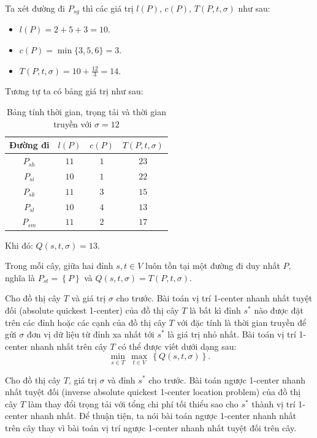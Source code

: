 \documentclass[12pt,oneside,a4paper]{bookAnh1}
\theoremstyle{plain}
\theoremstyle{nonumberplain}
\numberwithin{equation}{chapter}
\begin{document}
{\begin{example}
Ta xét đường đi ${{P}_{sg}}$ thì các giá trị
$l(P)$, $c(P)$, $T(P,t,\sigma)$ như sau:
\begin{itemize}
\item $l(P)=2+5+3=10.$
\item $c(P)=\min\{3,5,6\}=3.$
\item $T\left( P,t,\sigma  \right)=10+\frac{12}{3}=14.$
\end{itemize}
Tương tự ta có bảng giá trị như sau:
    \begin{table}[H]
        \centering
\caption{Bảng tính thời gian, trọng tải và thời gian truyền với $\sigma =12$}
        \label{tab1}
       \begin{tabular}{c c c c }
  \hline
  Đường đi & $l(P)$ & $c(P)$  & $T(P,t,\sigma )$   \\
  \hline
${{P}_{sh}}$ & $11$    & $1$  & $23$\\
${{P}_{si}}$ & $10$    & $1$  & $22$ \\
${{P}_{sk}}$ & $11$    & $3$  & $15$ \\
${{P}_{sl}}$ & $10$    & $4$  & $13$ \\
${{P}_{sm}}$ & $11$    & $2$  & $17$ \\
 \hline
\end{tabular}
    \end{table}
Khi đó: $Q\left( s,t,\sigma  \right)=13.$
\end{example}
\begin{remark}
    Trong mỗi cây, giữa hai đỉnh $s,t\in V$ luôn tồn tại một đường đi duy nhất $P,$ nghĩa là ${{P}_{st}}=\left\{ P \right\}$ và $Q\left( s,t,\sigma  \right)=T\left( P,t,\sigma  \right).$
\end{remark}
\begin{definition}
    Cho đồ thị cây $T$ và giá trị $\sigma $ cho trước. Bài toán vị trí 1-center nhanh nhất tuyệt đối (absolute quickest 1-center) của đồ thị cây $T$ là bất kì đỉnh $s^*$ nào được đặt trên các đỉnh hoặc các cạnh của đồ thị cây $T$ với đặc tính là thời gian truyền để gửi $\sigma $ đơn vị dữ liệu từ đỉnh xa nhất tới $s^*$ là giá trị nhỏ nhất. Bài toán vị trí 1-center nhanh nhất trên cây $T$ có thể được viết dưới dạng sau:
$$\underset{s\in T}{\mathop{\min }}\,\underset{t\in V}{\mathop{\max }}\,\left\{ Q\left( s,t,\sigma  \right) \right\}.$$
\end{definition}

\begin{definition}
Cho đồ thị cây $T$, giá trị $\sigma $ và đỉnh $s^*$ cho trước. Bài toán ngược 1-center nhanh nhất tuyệt đối (inverse absolute quickest 1-center location problem) của đồ thị cây $T$ làm thay đổi trọng tải với tổng chi phí tối thiểu sao cho $s^*$ thành vị trí 1-center nhanh nhất. Để thuận tiện, ta nói bài toán ngược 1-center nhanh nhất trên cây thay vì bài toán vị trí ngược 1-center nhanh nhất tuyệt đối trên cây.
\end{definition}





}
\end{document}
